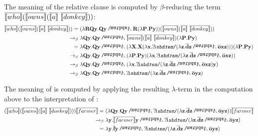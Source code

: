 \begin{example}
The meaning of the relative clause  is computed by $\beta$-reducing the term $\tr{\I{who}}  (\tr{\I{owns}}  (\tr{\I{a}} \ \tr{\I{donkey}} ))$:
\begin{align*}
 \tr{\I{who}}  (\tr{\I{owns}}  (\tr{\I{a}} \ \tr{\I{donkey}} )) = \ & (\lambda \R2 \Q2 \y2.  \Q2 \y2 \cnj2  \R2 (\lambda \P2. \P2 \y2 ) ) (\tr{\I{owns}}  (\tr{\I{a}} \ \tr{\I{donkey}} )) \\
\bconv \ &  \lambda \Q2 \y2. \Q2 \y2 \cnj2  \tr{\I{owns}}  (\tr{\I{a}} \ \tr{\I{donkey}}) (\lambda \P2. \P2 \y2)   \\
= \ & \lambda \Q2 \y2. \Q2 \y2 \cnj2  ( \lambda \X2. \X2 ( \lambda \x2.  \ex2 (\lambda \z2.  \tr{\cdonkey}  \z2 \cnj2 \tr{\cown}  \x2 \z2 ) ) )  (\lambda \P2. \P2 \y2)   \\
\bconv \ & \lambda \Q2 \y2.  \Q2 \y2 \cnj2  ( \lambda \P2. \P2 \y2) ( \lambda \x2.  \ex2 (\lambda \z2.  \tr{\cdonkey}  \z2 \cnj2 \tr{\cown}  \x2 \z2 ) )     \\
\bconv \ & \lambda \Q2 \y2. \Q2 \y2 \cnj2  (   \lambda \x2.  \ex2 (\lambda \z2.   \tr{\cdonkey}  \z2 \cnj2 \tr{\cown}  \x2 \z2)    \y2)   \\
\bconv \ & \lambda \Q2 \y2.  \Q2 \y2 \cnj2   \ex2 (\lambda \z2.  \tr{\cdonkey}  \z2 \cnj2 \tr{\cown}  \y2 \z2  ) 
\end{align*}

The meaning of  is computed by applying the resulting $\lambda$-term in the computation above to the interpretation of :
\begin{align*}
 (\tr{\I{who}}  (\tr{\I{owns}}  (\tr{\I{a}} \ \tr{\I{donkey}} ) ) )\tr{\I{farmer}} 
 = \ & (\lambda \Q2 \y2.  \Q2 \y2 \cnj2   \ex2 (\lambda \z2.  \tr{\cdonkey}  \z2 \cnj2 \tr{\cown}  \y2 \z2  )) \tr{\I{farmer}} \\
\bconv \ & \lambda  \y2.  \tr{\I{farmer}} \y2 \cnj2   \ex2 (\lambda \z2.  \tr{\cdonkey}  \z2 \cnj2 \tr{\cown}  \y2 \z2  )   \\ 
= \ & \lambda  \y2.  \tr{\cfarmer} \y2 \cnj2   \ex2 (\lambda \z2.  \tr{\cdonkey} \z2 \cnj2 \tr{\cown}  \y2 \z2 )   
\end{align*}


\end{example}
